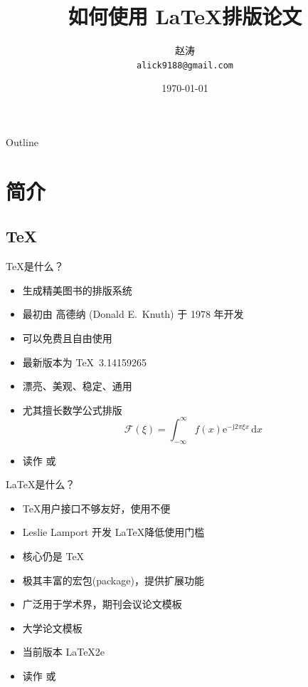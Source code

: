 \documentclass{beamer}
\title
{如何使用 \LaTeX 排版论文}
\author[alick9188] %
{赵涛\\ \texttt{alick9188@gmail.com}}
\institute[GitHub] %
{
  清华大学电子系网络融合实验室
}
\date[图书馆专题培训讲座] %
{\today}
\begin{document}
\begin{frame}
  \titlepage
\end{frame}

\begin{frame}{Outline}
  \tableofcontents
\end{frame}




\section{简介}

\subsection{\TeX}

\begin{frame}[fragile]{\TeX 是什么？}
  \begin{itemize}
    \item 生成精美图书的排版系统
    \item 最初由 高德纳 (Donald E.~Knuth) 于 1978 年开发
    \item 可以免费且自由使用
    \item 最新版本为 \TeX\ 3.14159265
    \item 漂亮、美观、稳定、通用
    \item 尤其擅长数学公式排版
      \begin{equation}
        \mathcal{F}(\xi)=\int_{-\infty}^{\infty}
        f(x)\mathrm{e}^{-\mathrm{j}2\pi \xi x}\,\mathrm{d}x
      \end{equation}
    \item 读作  或 
  \end{itemize}
\end{frame}

\begin{frame}{\LaTeX 是什么？}
  \begin{itemize}
    \item \TeX 用户接口不够友好，使用不便
    \item Leslie Lamport 开发 \LaTeX 降低使用门槛
    \item 核心仍是 \TeX
    \item 极其丰富的宏包(package)，提供扩展功能
    \item 广泛用于学术界，期刊会议论文模板
    \item 大学论文模板
    \item 当前版本 \LaTeX2e
    \item 读作  或 
  \end{itemize}
\end{frame}
\end{document}
